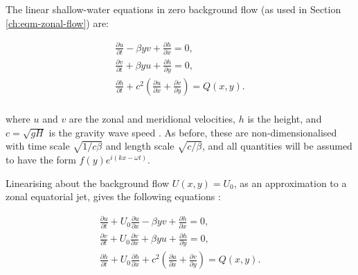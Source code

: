 


The linear shallow-water equations in zero background flow (as used in Section \ref{ch:eqm-zonal-flow}) are:

 \begin{equation}\label{eqn:sw-eqns-1}
   \begin{gathered}
      \frac{\partial u}{\partial t} - \beta y v +\frac{\partial h}{\partial x} = 0, \\
       \frac{\partial v}{\partial t} + \beta y u + \frac{\partial h}{\partial y} = 0, \\
     \frac{\partial h}{\partial t} +c^{2}(\frac{\partial u}{\partial x} + \frac{\partial v}{\partial y}) = Q(x,y). \\
   \end{gathered}
 \end{equation}

 where $u$ and $v$ are the zonal and meridional velocities, $h$ is the height, and $c = \sqrt{gH}$ is the gravity wave speed \citep{matsuno1966quasi}. As before, these are non-dimensionalised with time scale $\sqrt{1/c \beta}$ and length scale $\sqrt{c/\beta}$, and all quantities will be assumed to have the form $f(y) e^{i( k x-\omega t)}$.


Linearising about the background flow $U(x,y) = U_{0}$, as an approximation to a zonal equatorial jet, gives the following equations \citep{tsai2014three}:

 \begin{equation}\label{eqn:sw-eqns-U0}
   \begin{gathered}
      \frac{\partial u}{\partial t} + U_{0} \frac{\partial u}{\partial x} - \beta y v +\frac{\partial h}{\partial x} = 0, \\
       \frac{\partial v}{\partial t} + U_{0} \frac{\partial v}{\partial x} + \beta y u + \frac{\partial h}{\partial y} = 0, \\
     \frac{\partial h}{\partial t} + U_{0} \frac{\partial h}{\partial x} +c^{2}(\frac{\partial u}{\partial x} + \frac{\partial v}{\partial y}) = Q(x,y). \\
   \end{gathered}
 \end{equation}

